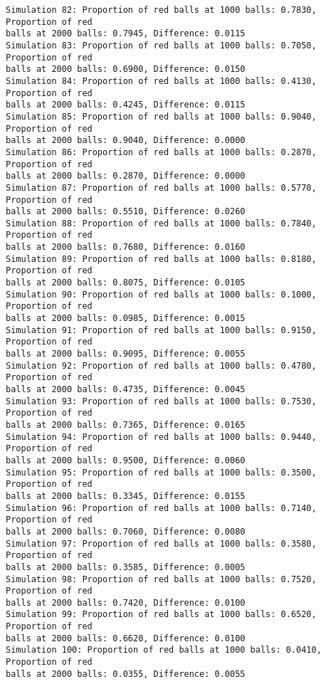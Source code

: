 \documentclass[11pt]{article}
\begin{document}
\begin{Verbatim}[commandchars=\\\{\}]
Simulation 82: Proportion of red balls at 1000 balls: 0.7830, Proportion of red
balls at 2000 balls: 0.7945, Difference: 0.0115
Simulation 83: Proportion of red balls at 1000 balls: 0.7050, Proportion of red
balls at 2000 balls: 0.6900, Difference: 0.0150
Simulation 84: Proportion of red balls at 1000 balls: 0.4130, Proportion of red
balls at 2000 balls: 0.4245, Difference: 0.0115
Simulation 85: Proportion of red balls at 1000 balls: 0.9040, Proportion of red
balls at 2000 balls: 0.9040, Difference: 0.0000
Simulation 86: Proportion of red balls at 1000 balls: 0.2870, Proportion of red
balls at 2000 balls: 0.2870, Difference: 0.0000
Simulation 87: Proportion of red balls at 1000 balls: 0.5770, Proportion of red
balls at 2000 balls: 0.5510, Difference: 0.0260
Simulation 88: Proportion of red balls at 1000 balls: 0.7840, Proportion of red
balls at 2000 balls: 0.7680, Difference: 0.0160
Simulation 89: Proportion of red balls at 1000 balls: 0.8180, Proportion of red
balls at 2000 balls: 0.8075, Difference: 0.0105
Simulation 90: Proportion of red balls at 1000 balls: 0.1000, Proportion of red
balls at 2000 balls: 0.0985, Difference: 0.0015
Simulation 91: Proportion of red balls at 1000 balls: 0.9150, Proportion of red
balls at 2000 balls: 0.9095, Difference: 0.0055
Simulation 92: Proportion of red balls at 1000 balls: 0.4780, Proportion of red
balls at 2000 balls: 0.4735, Difference: 0.0045
Simulation 93: Proportion of red balls at 1000 balls: 0.7530, Proportion of red
balls at 2000 balls: 0.7365, Difference: 0.0165
Simulation 94: Proportion of red balls at 1000 balls: 0.9440, Proportion of red
balls at 2000 balls: 0.9500, Difference: 0.0060
Simulation 95: Proportion of red balls at 1000 balls: 0.3500, Proportion of red
balls at 2000 balls: 0.3345, Difference: 0.0155
Simulation 96: Proportion of red balls at 1000 balls: 0.7140, Proportion of red
balls at 2000 balls: 0.7060, Difference: 0.0080
Simulation 97: Proportion of red balls at 1000 balls: 0.3580, Proportion of red
balls at 2000 balls: 0.3585, Difference: 0.0005
Simulation 98: Proportion of red balls at 1000 balls: 0.7520, Proportion of red
balls at 2000 balls: 0.7420, Difference: 0.0100
Simulation 99: Proportion of red balls at 1000 balls: 0.6520, Proportion of red
balls at 2000 balls: 0.6620, Difference: 0.0100
Simulation 100: Proportion of red balls at 1000 balls: 0.0410, Proportion of red
balls at 2000 balls: 0.0355, Difference: 0.0055
    \end{Verbatim}


    
    
    
\end{document}

